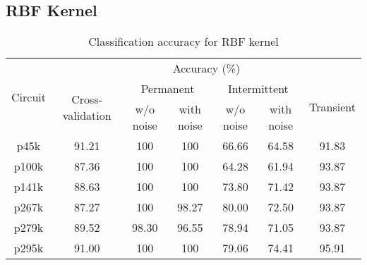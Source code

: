 \subsection{RBF Kernel}
\begin{table}[h]

	\captionsetup{justification=centering}
\begin{tabular}{ccccccc}
\hline
\multirow{3}{*}{Circuit} & \multicolumn{6}{c}{Accuracy (\%)}\\ \cline{2-7} 
                         & \multirow{2}{*}{Cross-validation} & \multicolumn{2}{c}{Permanent} & \multicolumn{2}{c}{Intermittent} & \multirow{2}{*}{Transient} \\ \cline{3-6}
                         &                                   & w/o noise     & with noise    & w/o noise      & with noise      &                            \\ \hline
p45k                     & 91.21                             & 100           & 100           & 66.66          & 64.58           & 91.83                      \\
p100k                    & 87.36                             & 100           & 100           & 64.28          & 61.94           & 93.87                      \\
p141k                    & 88.63                             & 100           & 100           & 73.80          & 71.42           & 93.87                      \\
p267k                    & 87.27                             & 100           & 98.27         & 80.00          & 72.50           & 93.87                      \\
p279k                    & 89.52                             & 98.30         & 96.55         & 78.94          & 71.05           & 93.87                      \\
p295k                    & 91.00                             & 100           & 100           & 79.06          & 74.41           & 95.91                     \\
\hline                                                     
\end{tabular}
\caption {Classification accuracy for RBF kernel}
\label{tab:rbfwp}
\end{table}


